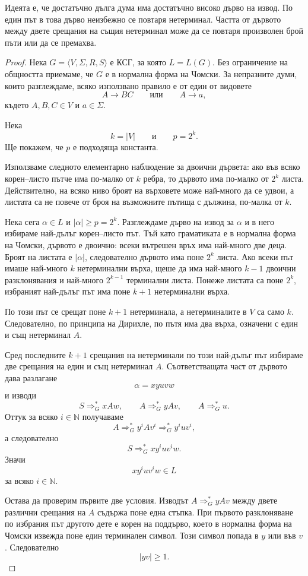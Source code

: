 Идеята е, че достатъчно дълга дума има достатъчно високо дърво на извод. По един път в това дърво неизбежно се повтаря нетерминал. Частта от дървото между двете срещания на същия нетерминал може да се повтаря произволен брой пъти или да се премахва.

\begin{proof}
Нека $G=\langle V,\Sigma,R,S\rangle$ е КСГ, за която $L=L(G)$. Без ограничение на общността приемаме, че $G$ е в нормална форма на Чомски. За непразните думи, които разглеждаме, всяко използвано правило е от един от видовете
\[
A\to BC
\qquad\text{или}\qquad
A\to a,
\]
където $A,B,C\in V$ и $a\in\Sigma$.

Нека
\[
k=|V|
\qquad\text{и}\qquad
p=2^k.
\]
Ще покажем, че $p$ е подходяща константа.

Използваме следното елементарно наблюдение за двоични дървета: ако във всяко корен--листо пътче има по-малко от $k$ ребра, то дървото има по-малко от $2^k$ листа. Действително, на всяко ниво броят на върховете може най-много да се удвои, а листата са не повече от броя на възможните пътища с дължина, по-малка от $k$.

Нека сега $\alpha\in L$ и $|\alpha|\geq p=2^k$. Разглеждаме дърво на извод за $\alpha$ и в него избираме най-дълъг корен--листо път. Тъй като граматиката е в нормална форма на Чомски, дървото е двоично: всеки вътрешен връх има най-много две деца. Броят на листата е $|\alpha|$, следователно дървото има поне $2^k$ листа. Ако всеки път имаше най-много $k$ нетерминални върха, щеше да има най-много $k-1$ двоични разклонявания и най-много $2^{k-1}$ терминални листа. Понеже листата са поне $2^k$, избраният най-дълъг път има поне $k+1$ нетерминални върха.

По този път се срещат поне $k+1$ нетерминала, а нетерминалите в $V$ са само $k$. Следователно, по принципа на Дирихле, по пътя има два върха, означени с един и същ нетерминал $A$.

Сред последните $k+1$ срещания на нетерминали по този най-дълъг път избираме две срещания на един и същ нетерминал $A$. Съответстващата част от дървото дава разлагане
\[
\alpha=xyuvw
\]
и изводи
\[
S\Rightarrow_G^* xAw,
\qquad
A\Rightarrow_G^* yAv,
\qquad
A\Rightarrow_G^* u.
\]
Оттук за всяко $i\in\mathbb{N}$ получаваме
\[
A\Rightarrow_G^* y^iAv^i
\Rightarrow_G^* y^iuv^i,
\]
а следователно
\[
S\Rightarrow_G^* xy^iuv^iw.
\]
Значи
\[
xy^iuv^iw\in L
\]
за всяко $i\in\mathbb{N}$.

Остава да проверим първите две условия. Изводът $A\Rightarrow_G^* yAv$ между двете различни срещания на $A$ съдържа поне една стъпка. При първото разклоняване по избрания път другото дете е корен на поддърво, което в нормална форма на Чомски извежда поне един терминален символ. Този символ попада в $y$ или във $v$. Следователно
\[
|yv|\geq 1.
\]


\end{proof}
